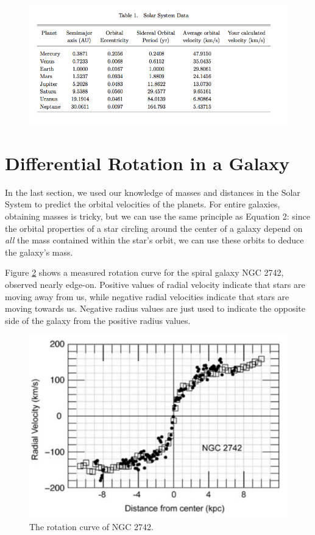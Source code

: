 \documentclass[11pt]{article}%
\begin{document}
\begin{figure}[h!] \label{tab:planets}
\center
\includegraphics[scale=0.55]{table1.png}
\label{table1}
\end{figure}


\break
\section{Differential Rotation in a Galaxy}

\noindent
In the last section, we used our knowledge of masses and distances in the Solar System to predict the orbital velocities of the planets. For entire galaxies, obtaining masses is tricky, but we can use the same principle as Equation 2: since the orbital properties of a star circling around the center of a galaxy depend on \emph{all} the mass contained within the star's orbit, we can use these orbits to deduce the galaxy's mass. 

Figure \ref{fig:rotcurve} shows a measured rotation curve for the spiral galaxy NGC 2742, observed nearly edge-on. Positive values of radial velocity indicate that stars are moving away from us, while negative radial velocities indicate that stars are moving towards us. Negative radius values are just used to indicate the opposite side of the galaxy from the positive radius values. 

\begin{figure}[h!]
\center
\includegraphics[scale=0.6]{rotation curve 2742.jpg}
\caption{The rotation curve of NGC 2742.}
\label{fig:rotcurve}
\end{figure}
\end{document}
